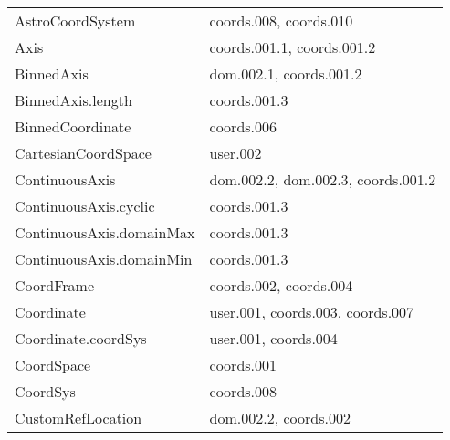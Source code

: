 \begin{longtable}[l]{|l|l|}
        AstroCoordSystem                  & coords.008, coords.010                      \\
        Axis                              & coords.001.1, coords.001.2                  \\
        BinnedAxis                        & dom.002.1, coords.001.2                     \\
        BinnedAxis.length                 & coords.001.3                                \\
        BinnedCoordinate                  & coords.006                                  \\
        CartesianCoordSpace               & user.002                                    \\
        ContinuousAxis                    & dom.002.2, dom.002.3, coords.001.2          \\
        ContinuousAxis.cyclic             & coords.001.3                                \\
        ContinuousAxis.domainMax          & coords.001.3                                \\
        ContinuousAxis.domainMin          & coords.001.3                                \\
        CoordFrame                        & coords.002, coords.004                      \\
        Coordinate                        & user.001, coords.003, coords.007            \\
        Coordinate.coordSys               & user.001, coords.004                        \\
        CoordSpace                        & coords.001                                  \\
        CoordSys                          & coords.008                                  \\
        CustomRefLocation                 & dom.002.2, coords.002                       \\

\end{longtable}
